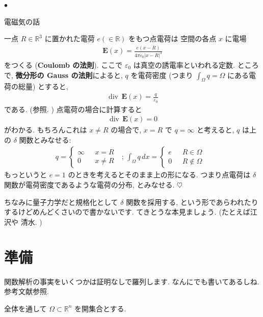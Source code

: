 \documentclass[openany, a4paper, oneside]{book}
\newcounter{enum2}
\renewenvironment{itemize}{%
\begin{list}{$\bullet$\ \ }%
{%
\usecounter{enum2}
\setlength{\itemindent}{0pt}%
\setlength{\leftmargin}{6pt}%
\setlength{\rightmargin}{0pt}%
\setlength{\labelsep}{0pt}%
\setlength{\labelwidth}{6pt}%
\setlength{\itemsep}{0pt}%
\setlength{\parsep}{0pt}%
\setlength{\listparindent}{0pt}%
}
}{%
\end{list}%
}
\DeclareMathOperator{\divergence}{div \,}
\theoremstyle{break}
\theoremstyle{breakdefn}
\newcommand{\bbR}{\mathbb{R}}
\newcommand{\bbRthree}{\mathbb{R}^3}
\begin{document}
\begin{itemize}
\item 電磁気の話
\end{itemize}
一点 $R \in \bbRthree$ に置かれた電荷 $e (\in \bbR)$ をもつ点電荷は
空間の各点 $x$ に電場
\begin{align}
 \mathbf{E}(x)
 =
 \frac{e (x - R)}{4\pi \varepsilon_0 |x - R|^3}
\end{align}
をつくる (\textbf{Coulomb の法則}).
ここで $\varepsilon_0$ は真空の誘電率といわれる定数.
ところで, \textbf{微分形の Gauss の法則}によると,
$q$ を電荷密度 (つまり $\int_{\Omega}q = \Omega$ にある電荷の総量) とすると,
\begin{align}
 \divergence \mathbf{E}(x)
 =
 \frac{q}{\varepsilon_0}
\end{align}
である. (\cite{ShigenobuSunagawa2}参照. )
点電荷の場合に計算すると
\begin{align}
 \divergence \mathbf{E}(x) = 0
\end{align}
がわかる.
もちろんこれは $x \neq R$ の場合で,
$x = R$ で $q = \infty$ と考えると,
$q$ は上の $\delta$ 関数とみなせる:
\begin{align}
 q
 =
 \begin{cases}
  \infty & \text{ $x = R$ } \\
  0 & \text{ $x \neq R$ }
 \end{cases}; \,
 \int_{\Omega}q \, dx
 =
 \begin{cases}
  e & \text{ $R\in \Omega$ } \\
  0 & \text{ $R \not\in \Omega$ }
 \end{cases}
\end{align}
もっというと $e = 1$ のときを考えるとそのまま上の形になる.
つまり点電荷は $\delta$ 関数が電荷密度であるような電荷の分布, とみなせる.
$\heartsuit$

ちなみに量子力学だと規格化として $\delta$ 関数を採用する,
という形であらわれたりするけどめんどくさいので書かないです.
てきとうな本見ましょう.
(たとえば江沢\cite{HiroshiEzawa3, HiroshiEzawa4}や
清水\cite{AkiraShimizu2}. )
\section{準備}
\label{sec-7-12-3}

関数解析の事実をいくつかは証明なしで羅列します.
なんにでも書いてあるしね.
参考文献参照\cite{LiebLoss1, HisayaMasuda1, ShizuoMiyajima1, ShizuoMiyajima2}.

全体を通して $\Omega \subset \mathbb{R}^n$ を開集合とする.
\end{document}
